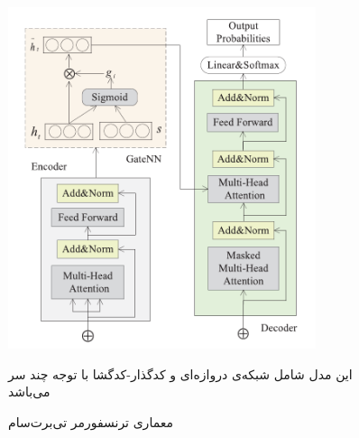 \begin{figure}[!h]
	\begin{center}
		\includegraphics[height=10cm]{tbertsum_transformer.png}
	\end{center}
	\caption{ معماری ترنسفورمر تی‌برت‌سام \cite{Ma2022TBERTSumTT}}
	\label{fig:tBert_transformer}
	\medskip
	\small
	\centerline{	این مدل شامل شبکه‌ی دروازه‌ای و کدگذار-کدگشا با توجه چند سر می‌باشد \cite{Ma2022TBERTSumTT}}
	
\end{figure}

